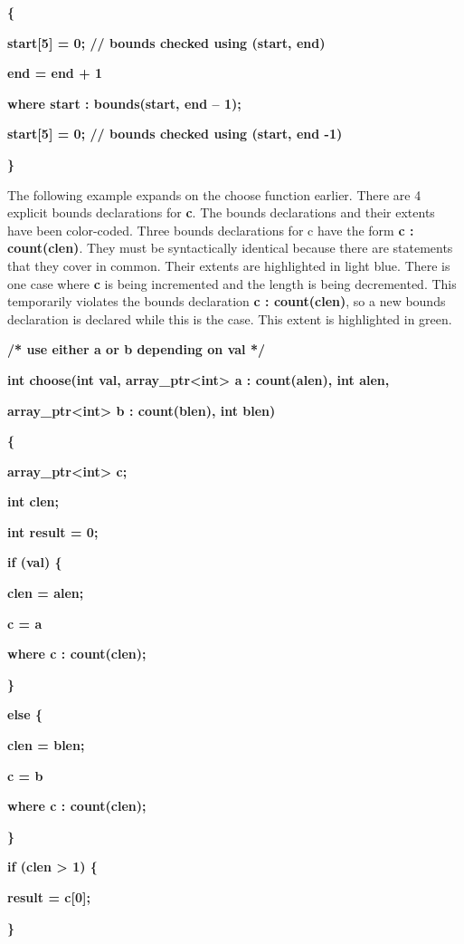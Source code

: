 \documentclass[]{article}
\begin{document}
\textbf{\{ }

\textbf{start{[}5{]} = 0; // bounds checked using (start, end)}

\textbf{end = end + 1}

\textbf{where start : bounds(start, end -- 1);}

\textbf{start{[}5{]} = 0; // bounds checked using (start, end -1)}

\textbf{\}}

The following example expands on the choose function earlier. There are
4 explicit bounds declarations for \textbf{c}. The bounds declarations
and their extents have been color-coded. Three bounds declarations for c
have the form \textbf{c : count(clen)}. They must be syntactically
identical because there are statements that they cover in common. Their
extents are highlighted in light blue. There is one case where
\textbf{c} is being incremented and the length is being decremented.
This temporarily violates the bounds declaration \textbf{c :
count(clen)}, so a new bounds declaration is declared while this is the
case. This extent is highlighted in green.

\textbf{/* use either a or b depending on val */}

\textbf{int choose(int val, array\_ptr\textless{}int\textgreater{} a :
count(alen), int alen,}

\textbf{array\_ptr\textless{}int\textgreater{} b : count(blen), int
blen) }

\textbf{\{}

\textbf{array\_ptr\textless{}int\textgreater{} c;}

\textbf{int clen;}

\textbf{int result = 0;}

\textbf{if (val) \{}

\textbf{clen = alen;}

\textbf{c = a}

\textbf{where c : count(clen);}

\textbf{\}}

\textbf{else \{}

\textbf{clen = blen;}

\textbf{c = b}

\textbf{where c : count(clen);}

\textbf{\}}

\textbf{if (clen \textgreater{} 1) \{}

\textbf{result = c{[}0{]};}

\textbf{\}}
\end{document}
